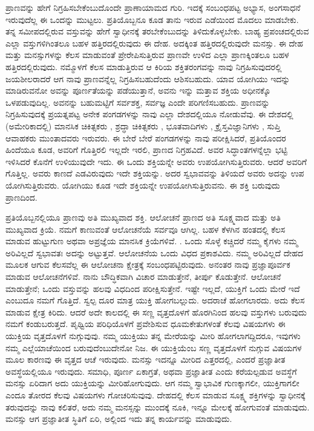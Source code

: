 ಪ್ರಾಣವನ್ನು ಹೇಗೆ ನಿಗ್ರಹಿಸಬೇಕೆಂಬುದೊಂದೇ ಪ್ರಾಣಾಯಾಮದ ಗುರಿ. ಇದಕ್ಕೆ ಸಂಬಂಧಪಟ್ಟ ಅಭ್ಯಾಸ, ಅಂಗಸಾಧನೆ ಇರುವುದೆಲ್ಲ ಈ ಒಂದನ್ನು ಮುಟ್ಟಲು. ಪ್ರತಿಯೊಬ್ಬನೂ ಕೂಡ ತಾನು ಇರುವ ಎಡೆಯಿಂದ ಮೊದಲು ಮಾಡಬೇಕು. ತನ್ನ ಸಮೀಪದಲ್ಲಿರುವ ವಸ್ತುವನ್ನು ಹೇಗೆ ಸ್ವಾಧೀನಕ್ಕೆ ತರಬೇಕೆಂಬುದನ್ನು ತಿಳಿದುಕೊಳ್ಳಬೇಕು. ಬಾಹ್ಯ ಪ್ರಪಂಚದಲ್ಲಿರುವ ಎಲ್ಲಾ ವಸ್ತುಗಳಿಗಿಂತಲೂ ಬಹಳ ಹತ್ತಿರದಲ್ಲಿರುವುದು ಈ ದೇಹ. ಅದಕ್ಕಿಂತ ಹತ್ತಿರದಲ್ಲಿರುವುದೇ ಮನಸ್ಸು. ಈ ದೇಹ ಮತ್ತು ಮನಸ್ಸುಗಳನ್ನು ಕೆಲಸ ಮಾಡುವಂತೆ ಪ್ರೇರೇಪಿಸುತ್ತಿರುವ ಪ್ರಾಣವೇ ಉಳಿದ ಎಲ್ಲಾ ಪ್ರಾಣಕ್ಕಿಂತಲೂ ಬಹಳ ಹತ್ತಿರದಲ್ಲಿರುವುದು. ನಮ್ಮೊಳಗೆ ಕೆಲಸ ಮಾಡುತ್ತಿರುವ ಆ ಕಿರಿಯ ಶಕ್ತಿತರಂಗವನ್ನು ನಾವು ನಿಗ್ರಹಿಸುವುದರಲ್ಲಿ ಜಯಶೀಲರಾದರೆ ಆಗ ನಾವು ಪ್ರಾಣವನ್ನೆಲ್ಲ ನಿಗ್ರಹಿಸಬಹುದೆಂದು ಆಶಿಸಬಹುದು. ಯಾವ ಯೋಗಿಯು ಇದನ್ನು ಮಾಡಿರುವನೋ ಅವನ್ನು ಪೂರ್ಣತೆಯನ್ನು ಪಡೆಯುತ್ತಾನೆ, ಅವನು ಇನ್ನು ಮತ್ತಾವ ಶಕ್ತಿಯ ಅಧೀನಕ್ಕೊ ಒಳಪಡುವುದಿಲ್ಲ. ಅವನನ್ನು ಬಹುಮಟ್ಟಿಗೆ ಸರ್ವಶಕ್ತ, ಸರ್ವಜ್ಞ ಎಂದೇ ಪರಿಗಣಿಸಬಹುದು. ಪ್ರಾಣವನ್ನು ನಿಗ್ರಹಿಸುವುದಕ್ಕೆ ಪ್ರಯತ್ನಪಟ್ಟ ಅನೇಕ ಪಂಗಡಗಳನ್ನು ನಾವು ಎಲ್ಲಾ ದೇಶದಲ್ಲಿಯೂ ನೋಡುವೆವು. ಈ ದೇಶದಲ್ಲಿ (ಅಮೇರಿಕಾದಲ್ಲಿ) ಮಾನಸಿಕ ಚಿಕಿತ್ಸಕರು , ಶ್ರದ್ಧಾ ಚಿಕಿತ್ಸಕರು , ಭೂತವಾದಿಗಳು , ಕ್ರೈಸ್ತವಿಜ್ಞಾನಿಗಳು , ಸುಪ್ತಿ ಆವಾಹಕರು  ಮುಂತಾದವರು ಇರುವರು. ಈ ಬೇರೆ ಬೇರೆ ಪಂಗಡಗಳನ್ನು ನಾವು ಪರೀಕ್ಷಿಸಿದರೆ, ಪ್ರತಿಯೊಂದರ ಹಿಂದೆಯೂ ಕೂಡ, ಅವರಿಗೆ ಗೊತ್ತಿರಲಿ ಇಲ್ಲದೇ ಇರಲಿ, ಪ್ರಾಣದ ನಿಗ್ರಹವಿದೆ. ಅವರ ಸಿದ್ಧಾಂತಗಳನ್ನೆಲ್ಲಾ ಭಟ್ಟಿ ಇಳಿಸಿದರೆ ಕೊನೆಗೆ ಉಳಿಯುವುದೇ ಇದು. ಈ ಒಂದು ಶಕ್ತಿಯನ್ನೇ ಅವರು ಉಪಯೋಗಿಸುತ್ತಿರುವರು. ಆದರೆ ಅವರಿಗೆ ಗೊತ್ತಿಲ್ಲ. ಅವರು ಕಾಣದೆ ಎಡವಿರುವುದು ಇದೇ ಶಕ್ತಿಯನ್ನು. ಅದರ ಸ್ವಭಾವವನ್ನು ತಿಳಿಯದೆ ಅವರು ಅದನ್ನು ಉಪ ಯೋಗಿಸುತ್ತಿರುವರು. ಯೋಗಿಯು ಕೂಡ ಇದೇ ಶಕ್ತಿಯನ್ನೇ ಉಪಯೋಗಿಸುತ್ತಿರುವನು. ಈ ಶಕ್ತಿ ಬರುವುದು ಪ್ರಾಣದಿಂದ. 

\vskip 0.2cm

ಪ್ರತಿಯೊಬ್ಬನಲ್ಲಿಯೂ ಪ್ರಾಣವು ಅತಿ ಮುಖ್ಯವಾದ ಶಕ್ತಿ. ಆಲೋಚನೆ ಪ್ರಾಣದ ಅತಿ ಸೂಕ್ಷ್ಮವಾದ ಮತ್ತು ಅತಿ ಮುಖ್ಯವಾದ ಕ್ರಿಯೆ. ನಮಗೆ ಕಾಣುವಂತೆ ಆಲೋಚನೆಯೆ ಸರ್ವವೂ ಆಗಿಲ್ಲ. ಬಹಳ ಕೆಳಗಿನ ಹಂತದಲ್ಲಿ ಕೆಲಸ ಮಾಡುವ ಹುಟ್ಟುಗುಣ  ಅಥವಾ ಅಪ್ರಜ್ಞೆಯ ಮಾನಸಿಕ ಕ್ರಿಯೆಗಳಿವೆ. . ಒಂದು ಸೊಳ್ಳೆ ಕಚ್ಚಿದರೆ ನಮ್ಮ ಕೈಗಳು ನಮ್ಮ ಅರಿವಿಲ್ಲದೆ ಸ್ವಭಾವತಃ ಅದನ್ನು ಅಟ್ಟುತ್ತವೆ. ಆಲೋಚನೆಯ ಒಂದು ವಿಧದ ಪ್ರಕಾಶವಿದು. ನಮ್ಮ ಅರಿವಿಲ್ಲದೆ ದೇಹದ ಮೂಲಕ ಆಗುವ ಕೆಲಸವೆಲ್ಲ ಈ ಆಲೋಚನಾ ಕ್ಷೇತ್ರಕ್ಕೆ ಸಂಬಂಧಪಟ್ಟಿರುವುದು. ಅನಂತರ ನಾವು ಪ್ರಜ್ಞಾಪೂರ್ವಕ ಮಾಡುವ ಆಲೋಚನೆಗಳಿವೆ. ನಾನು ಬೌದ್ಧಿಕವಾಗಿ ವಿಚಾರ ಮಾಡುತ್ತೇನೆ, ತೀರ್ಪು ಕೊಡುತ್ತೇನೆ. ಆಲೋಚನೆ ಮಾಡುತ್ತೇನೆ; ಒಂದು ವಸ್ತುವನ್ನು ಹಲವು ವಿಧದಿಂದ ಪರೀಕ್ಷಿಸುತ್ತೇನೆ. ಇಷ್ಟೇ ಇಲ್ಲದೆ, ಯುಕ್ತಿಗೆ ಒಂದು ಮೇರೆ ಇದೆ ಎಂಬುದೂ ನಮಗೆ ಗೊತ್ತಿದೆ. ಸ್ವಲ್ಪ ದೂರ ಮಾತ್ರ ಯುಕ್ತಿ ಹೋಗಬಲ್ಲುದು. ಅದರಾಚೆ ಹೋಗಲಾರದು. ಅದು ಕೆಲಸ ಮಾಡುವ ಕ್ಷೇತ್ರ ಕಿರಿದು. ಆದರೆ ಅದೇ ಕಾಲದಲ್ಲಿ ಈ ಸಣ್ಣ ವೃತ್ತದೊಳಗೆ ಹೊರಗಿನಿಂದ ಹಲವು ವಸ್ತುಗಳು ಬರುವುದು ನಮಗೆ ಕಂಡುಬರುತ್ತದೆ. ಪೃಥ್ವಿಯ ಪರಿಧಿಯೊಳಗೆ ಪ್ರವೇಶಿಸುವ ಧೂಮಕೇತುಗಳಂತೆ ಕೆಲವು ವಿಷಯಗಳು ಈ ಯುಕ್ತಿಯ ವೃತ್ತದೊಳಗೆ ನುಗ್ಗುವುವು. ನಮ್ಮ ಯುಕ್ತಿಯು ತನ್ನ ಮೇರೆಯನ್ನು ಮೀರಿ ಹೋಗಲಾಗದ್ದಿದರೂ, ಇವುಗಳು ನಮ್ಮ ಎಲ್ಲೆಯಾಚೆಯಿಂದ ಬರುವುದೆಂಬುದೇನೋ ನಿಜ. ಈ ಯುಕ್ತಿಯೆಂಬ ಸಣ್ಣ ವೃತ್ತದೊಳಗೆ ನುಗ್ಗುವ ವಿಷಯಗಳ ಮೂಲ ಕಾರಣವು ಈ ವೃತ್ತದ ಆಚೆ ಇರುವುದು. ಮನಸ್ಸು ಇದನ್ನೂ ಮೀರಿದ ಎತ್ತರದಲ್ಲಿ, ಎಂದರೆ ಪ್ರಜ್ಞಾತೀತ ಅವಸ್ಥೆಯಲ್ಲಿಯೂ  ಇರುವುದು. ಸಮಾಧಿ, ಪೂರ್ಣ ಏಕಾಗ್ರತೆ, ಅಥವಾ ಪ್ರಜ್ಞಾತೀತ ಎಂದು ಕರೆಯಲ್ಪಡುವ ಅವಸ್ಥೆಗೆ ಮನಸ್ಸು ಏರಿದಾಗ ಅದು ಯುಕ್ತಿಯನ್ನು ಮೀರಿಹೋಗುವುದು. ಆಗ ನಮ್ಮ ಸ್ವಾಭಾವಿಕ ಗುಣಕ್ಕಾಗಲೀ, ಯುಕ್ತಿಗಾಗಲೀ ಎಂದೂ ತೋರದ ಕೆಲವು ವಿಷಯಗಳು ಗೋಚರಿಸುವುವು. ದೇಹದಲ್ಲಿ ಕೆಲಸ ಮಾಡುವ ಸೂಕ್ಷ್ಮ ಶಕ್ತಿಗಳನ್ನು ಸ್ವಾಧೀನಕ್ಕೆ ತರುವುದನ್ನು ನಾವು ಕಲಿತರೆ, ಅದು ನಮ್ಮ ಮನಸ್ಸನ್ನು ಮುಂದಕ್ಕೆ ನೂಕಿ, ಇನ್ನೂ ಮೇಲಕ್ಕೆ ಹೋಗುವಂತೆ ಮಾಡುವುದು. ಮನಸ್ಸು ಆಗ ಪ್ರಜ್ಞಾತೀತ ಸ್ಥಿತಿಗೆ ಏರಿ, ಅಲ್ಲಿಂದ ಇದು ತನ್ನ ಕಾರ್ಯವನ್ನು ಮಾಡುವುದು. 

